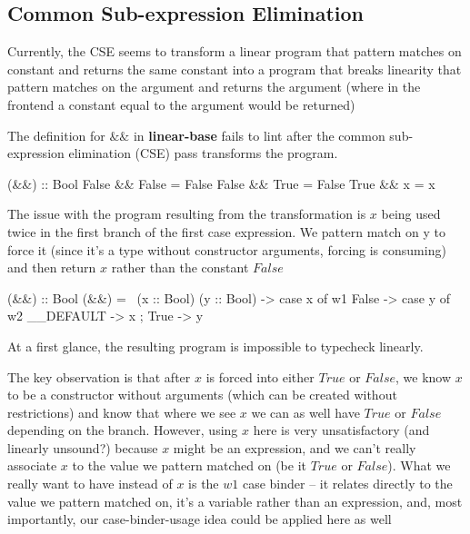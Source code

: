 \documentclass[a4paper, draft]{article}
\begin{document}
\subsection{Common Sub-expression Elimination}

Currently, the CSE seems to transform a linear program that pattern matches on
constant and returns the same constant into a program that breaks linearity that
pattern matches on the argument and returns the argument (where in the frontend
a constant equal to the argument would be returned)

The definition for $\&\&$ in \textbf{linear-base} fails to lint after the common
sub-expression elimination (CSE) pass transforms the program.
\begin{code}
(&&) :: Bool %
False && False = False
False && True = False
True && x = x
\end{code}
The issue with the program resulting from the transformation is $x$ being used
twice in the first branch of the first case expression. We pattern match on y to
force it (since it's a type without constructor arguments, forcing is consuming)
and then return $x$ rather than the constant $False$
\begin{code}
(&&) :: Bool %
(&&) = \ (x :: Bool) (y :: Bool) ->
  case x of w1 {
    False -> case y of w2 { __DEFAULT -> x };
    True -> y
  }
\end{code}
At a first glance, the resulting program is impossible to typecheck linearly.

The key observation is that after $x$ is forced into either $True$ or $False$,
we know $x$ to be a constructor without arguments (which can be created
without restrictions) and know that where we see $x$ we can as well have
$True$ or $False$ depending on the branch. However, using $x$ here is very
unsatisfactory (and linearly unsound?) because $x$ might be an expression, and
we can't really associate $x$ to the value we pattern matched on (be it $True$
or $False$). What we really want to have instead of $x$ is the $w1$ case binder --
it relates directly to the value we pattern matched on, it's a variable rather
than an expression, and, most importantly, our case-binder-usage idea could be
applied here as well

\end{document}
